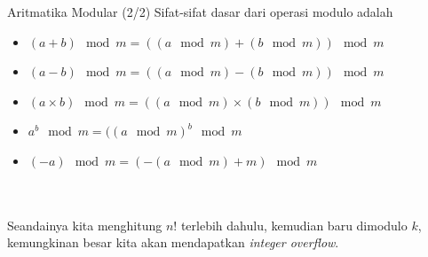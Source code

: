 \documentclass[english,t]{beamer}
\renewcommand{\emph}[1]{\textcolor{navyblue}{#1}}
\begin{document}
\begin{frame}{Aritmatika Modular (2/2)}
	Sifat-sifat dasar dari operasi modulo adalah
	\begin{itemize}   
		\item<2-> $(a+b) \mod m = ((a \mod m) + (b \mod m)) \mod m$
		\item<3-> $(a-b) \mod m = ((a \mod m) - (b \mod m)) \mod m$
		\item<4-> $(a \times b) \mod m = ((a \mod m) \times (b \mod m)) \mod m$
		\item<5-> $a^b \mod m = ((a \mod m)^b \mod m$
		\item<6-> $(-a) \mod m = (-(a \mod m) + m) \mod m$
	\end{itemize}
	
 \\
 \\
 Seandainya kita menghitung $n!$ terlebih dahulu, kemudian baru dimodulo $k$, kemungkinan besar kita akan mendapatkan \textit{integer overflow}.	
\end{frame}

%
\end{document}
